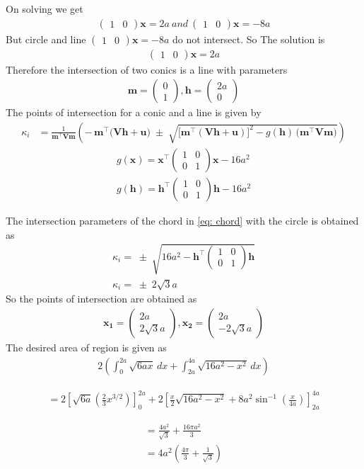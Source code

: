 \documentclass{beamer}
\theoremstyle{remark}
\newcommand{\myvec}[1]{\ensuremath{\begin{pmatrix}#1\end{pmatrix}}}
\let\vec\mathbf
\numberwithin{equation}{section}
\begin{document}
\begin{frame}
On solving we get
\begin{align}
\myvec{1&0}\vec{x} = 2a \ and \ \myvec{1&0}\vec{x} = -8a
\end{align}
But circle and line $\myvec{1&0}\vec{x} = -8a$ do not intersect.
So The solution is
\begin{align}
\myvec{1&0}\vec{x} = 2a   \label{eq: chord}
\end{align}
Therefore the intersection of two conics is a line with parameters
\begin{align}
\vec{m} = \myvec{0\\1} , \vec{h} = \myvec{2a\\0}
\end{align}
The points of intersection for a conic and a line is given by
\begin{align}
\kappa_i
  &= \frac{1}{\vec{m}^\top \vec{V}\vec{m}}
     \left(
       -\,\vec{m}^\top\big(\vec{V}\vec{h}+\vec{u}\big)
       \;\pm\;
       \sqrt{ \big[\vec{m}^\top(\vec{V}\vec{h}+\vec{u})\big]^2
       - g(\vec{h})\,\big(\vec{m}^\top \vec{V}\vec{m}\big)}
     \right)
\end{align}
\begin{align}
g(\vec{x}) = \vec{x}^\top\myvec{1&0\\0&1}\vec{x} - 16a^2 \\
g(\vec{h}) = \vec{h}^\top\myvec{1&0\\0&1}\vec{h} - 16a^2
\end{align}
\end{frame}
\begin{frame}
The intersection parameters of the chord in \eqref{eq: chord} with the circle is obtained as
\begin{align}
\kappa_i = \;\pm\;
            \sqrt{16a^2 - \vec{h}^\top\myvec{1&0\\0&1}\vec{h}} \\
            \kappa_i = \;\pm\;
                       2\sqrt{3}a
\end{align}
So the points of intersection are obtained as
\begin{align}
\vec{x_1} = \myvec{2a\\2\sqrt{3}a} , \vec{x_2} = \myvec{2a\\-2\sqrt{3}a}
\end{align}
The desired area of region is given as
\begin{align}
2 \left( 
\int_{0}^{2a} \sqrt{6ax}\, dx + 
\int_{2a}^{4a} \sqrt{16a^2 - x^2}\, dx
\right)
\end{align}

\begin{align}
= 2 \left[
\sqrt{6a} \left( \frac{2}{3} x^{3/2} \right)
\right]_{0}^{2a}
+ 2 \left[
\frac{x}{2} \sqrt{16a^2 - x^2}
+ 8a^2 \sin^{-1} \left( \frac{x}{4a} \right)
\right]_{2a}^{4a}
\end{align}
\end{frame}
\begin{frame}
\begin{align}
= \frac{4a^2}{\sqrt{3}} + \frac{16 \pi a^2}{3} \\
= 4a^2 \left(
       \frac{4\pi}{3} + \frac{1}{\sqrt{3}}
       \right)
\end{align}
\end{frame}
\end{document}
